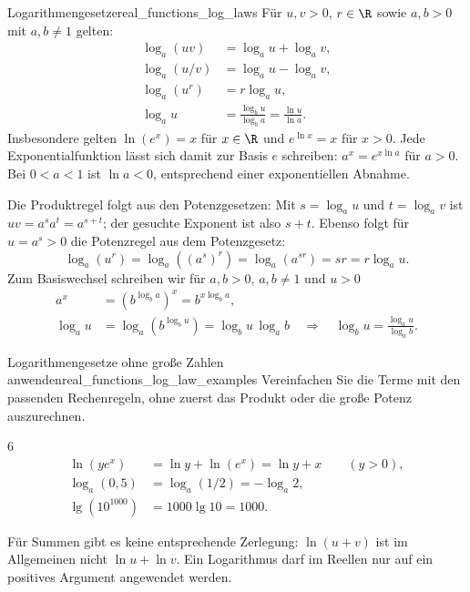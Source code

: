 \begin{TheoremBox}{Logarithmengesetze}{real_functions_log_laws}
  Für $u,v>0$, $r\in\R$ sowie $a,b>0$ mit $a,b\ne1$ gelten:
  \[
    \begin{aligned}
      \log_a(uv)&=\log_a u+\log_a v,\\[0.6em]
      \log_a(u/v)&=\log_a u-\log_a v,\\[0.6em]
      \log_a(u^r)&=r\log_a u,\\[0.6em]
      \log_a u&=\frac{\log_b u}{\log_b a}
               =\frac{\ln u}{\ln a}.
    \end{aligned}
  \]
  Insbesondere gelten $\ln(e^x)=x$ für $x\in\R$ und
  $e^{\ln x}=x$ für $x>0$.
  Jede Exponentialfunktion lässt sich damit zur Basis $e$ schreiben:
  $a^x=e^{x\ln a}$ für $a>0$. Bei $0<a<1$ ist $\ln a<0$,
  entsprechend einer exponentiellen Abnahme.
\end{TheoremBox}
Die Produktregel folgt aus den Potenzgesetzen:
Mit $s=\log_a u$ und $t=\log_a v$ ist
$uv=a^s a^t=a^{s+t}$; der gesuchte Exponent ist also $s+t$.
Ebenso folgt für $u=a^s>0$ die Potenzregel aus dem Potenzgesetz:
\[
  \log_a(u^r)=\log_a((a^s)^r)=\log_a(a^{sr})=sr=r\log_a u.
\]
Zum Basiswechsel schreiben wir für $a,b>0$, $a,b\ne1$ und $u>0$
\[
  \begin{aligned}
    a^x&=\left(b^{\log_b a}\right)^x=b^{x\log_b a},\\[0.6em]
    \log_a u&=\log_a\left(b^{\log_b u}\right)
      =\log_b u\,\log_a b
      \quad\Longrightarrow\quad
      \log_b u=\frac{\log_a u}{\log_a b}.
  \end{aligned}
\]
\begin{ExampleBox}{Logarithmengesetze ohne große Zahlen anwenden}{real_functions_log_law_examples}
  Vereinfachen Sie die Terme mit den passenden Rechenregeln,
  ohne zuerst das Produkt oder die große Potenz auszurechnen.
  \begin{ClozeArea}[34]{6}
    \[
      \begin{aligned}
        \ln(y e^x)&=\ln y+\ln(e^x)=\ln y+x\qquad(y>0),\\[0.7em]
        \log_a(0{,}5)&=\log_a(1/2)=-\log_a2,\\[0.7em]
        \lg(10^{1000})&=1000\lg10=1000.
      \end{aligned}
    \]
  \end{ClozeArea}
\end{ExampleBox}
\begin{RemarkBox}[remark title=Grenzen der Logarithmengesetze]
  Für Summen gibt es keine entsprechende Zerlegung:
  $\ln(u+v)$ ist im Allgemeinen nicht $\ln u+\ln v$.
  Ein Logarithmus darf im Reellen nur auf ein positives Argument
  angewendet werden.
\end{RemarkBox}

